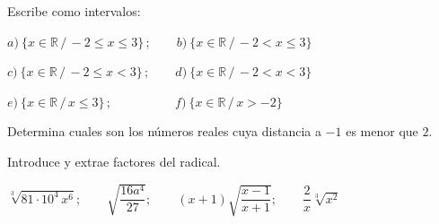 \vspace{-8mm}
\begin{flushright}
\begin{footnotesize} \textcolor{gris}{}	\end{footnotesize}
\end{flushright}


\begin{mipropuesto}

Escribe como intervalos:	 

\hspace{2cm} $a)\  \{x\in \mathbb R\, / \, -2\leq x \leq 3\}\,; \qquad b)\  \{x\in \mathbb R\, / \, -2< x \leq 3\}$

\hspace{2cm} $c)\  \{x\in \mathbb R\, / \, -2\leq x < 3\}\,; \qquad  d)\ \{x\in \mathbb R\, / \, -2< x < 3\}$

\hspace{2cm} $e)\  \{x\in \mathbb R\, / \,  x \leq 3\}\,; \quad \qquad \qquad  f)\ \{x\in \mathbb R\, / \,  x > -2 \}$
\end{mipropuesto}

\vspace{-8mm}
\begin{flushright}
\begin{footnotesize} \textcolor{gris}{\rotatebox{180}{ $\quad a)\ [-2,3]; \ \ b)\ ]-2,3]; \ \ c)\ [-2,3[; \ \ d)\ ]-2,3[; \ \ e)\ ]-\infty,3]; \ \ f)\ ]-2,+\infty[$ }}	\end{footnotesize}
\end{flushright}



\begin{mipropuesto}

Determina cuales son los números reales cuya distancia a $-1$ es menor que $2$.	
\end{mipropuesto}

\vspace{-8mm}
\begin{flushright}
\begin{footnotesize} \textcolor{gris}{\rotatebox{180}{$\{x\in \mathbb R \, / \, d(x,-1)<2\}\ = \ E_2(-1) \ \equiv \ ]-3,1[$}}	\end{footnotesize}
\end{flushright}

\begin{mipropuesto}

Introduce y extrae factores del radical.	

$\sqrt[3]{81\cdot 10^4\, x^6};\qquad \sqrt{\dfrac{16a^4}{27}} ;\qquad (x+1)\sqrt{\dfrac{x-1}{x+1}};\qquad \dfrac 2{x} \sqrt[3]{x^2} $
\end{mipropuesto}

